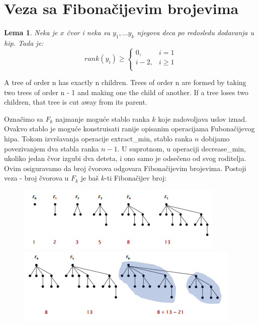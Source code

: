 \documentclass[a4paper]{article}
\theoremstyle{plain}
\newtheorem{lem}{Lema}[section] %
\theoremstyle{definition}
\begin{document}
\section{Veza sa Fibona\v{c}ijevim brojevima}
\label{sec:Fib}

\begin{lem}
    Neka je $x$ \v{c}vor i neka su $y_{1}, \dots y_{k}$ njegova deca po redosledu dodavanja u hip. Tada je:
    $$rank(y_{i}) \geq 
    \begin{cases}
        0, & i = 1\\
        i-2, & i \geq 1\\
    \end{cases}
    $$
\end{lem}

A tree of order n has exactly n children.
Trees of order n are formed by taking two trees of order n - 1 and making one the child of another.
If a tree loses two children, that tree is cut away from its parent.

Ozna\v{c}imo sa $F_{k}$ najmanje mogu\'c{}e stablo ranka $k$ koje zadovoljava uslov iznad. Ovakvo stablo je mogu\'{c}e konstruisati ranije opisanim operacijama Fubona\v{c}ijevog hipa. Tokom izvr\v{s}avanja operacije extract_min, stablo ranka $n$ dobijamo povezivanjem dva stabla ranka $n - 1$. U suprotnom, u operaciji decrease_min, ukoliko jedan \v{c}vor izgubi dva deteta, i ono samo je odse\v{c}eno od svog roditelja. Ovim osiguravamo da broj \v{c}vorova odgovara Fibona\v{c}ijevim brojevima. Postoji veza - broj \v{c}vorova u $F_{k}$ je ba\v{s} $k$-ti Fibona\v{c}ijev broj:
\begin{figure}[H]
    \centering
    \includegraphics[scale=0.85]{resources/fig6a.PNG}\\
    \includegraphics[scale=0.85]{resources/fig6b.PNG}
\end{figure}
\end{document}
